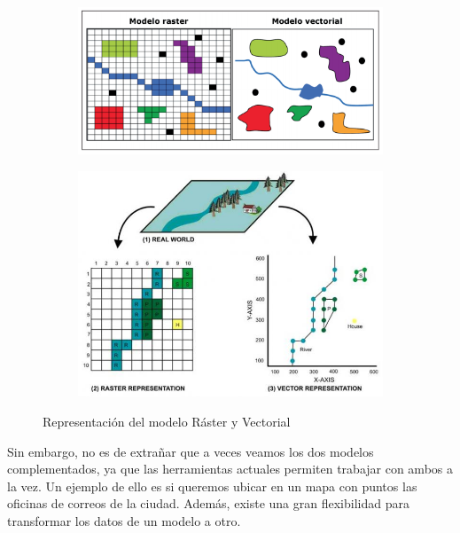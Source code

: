 \begin{figure}[H]
	\centering
	\begin{subfigure}[h]{0.71\textwidth} 
		\includegraphics[width=\textwidth]{imagenes/capitulo2/raster-vectorial}
		\caption{}
	\end{subfigure}       
	\begin{subfigure}[h]{0.76\textwidth} 
		\includegraphics[width=\textwidth]{imagenes/capitulo2/raster-vector-gis-i4}
		\caption{}
	\end{subfigure}
	\caption{Representación del modelo Ráster y Vectorial \cite{imagen2-52, imagen-2.51}}
	\label{fig:raster-vectorial}
\end{figure}

Sin embargo, no es de extrañar que a veces veamos los dos modelos complementados, ya que las herramientas actuales permiten trabajar con ambos a la vez. Un ejemplo de ello es si queremos ubicar en un mapa con puntos las oficinas de correos de la ciudad. Además, existe una gran flexibilidad para transformar los datos de un modelo a otro.\\

